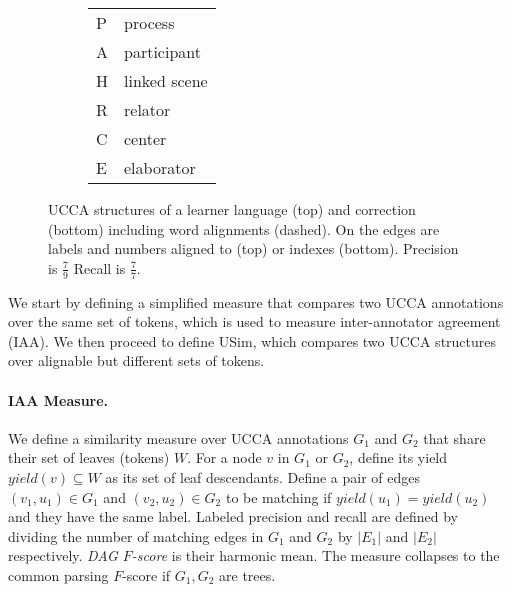 \documentclass[a4paper, 11pt]{article}
\begin{document}
\begin{figure}[t]
\begin{subfigure}{1.1\columnwidth}
{					\begin{adjustbox}{width=.3\columnwidth,margin=1pt,frame}
						\begin{tabular}{ll}
							P & process \\
							A & participant \\
							H & linked scene \\
							R & relator \\
							C & center \\
							E & elaborator \\
						\end{tabular}
					\end{adjustbox}
				}
			\end{subfigure}

				\caption{\label{fig:example}
					UCCA structures of a learner language (top) and correction (bottom) including word alignments (dashed). On the edges are labels and numbers aligned to (top) or indexes (bottom). Precision is $\frac{7}{9}$ Recall is $\frac{7}{7}$.
				}
			\end{figure}
We start by defining a simplified measure that compares two UCCA annotations over the 
same set of tokens, which is used to measure inter-annotator agreement (IAA). We then
proceed to define {\sc USim}, which compares two UCCA structures
over alignable but different sets of tokens.

\paragraph{IAA Measure.} We define a similarity measure over UCCA annotations 
$G_1$ and $G_2$ that share their set of leaves (tokens) $W$.
For a node $v$ in $G_1$ or $G_2$, define its yield $yield(v) \subseteq W$ as its
set of leaf descendants.
Define a pair of edges $(v_1,u_1) \in G_1$ and $(v_2,u_2) \in G_2$ to be matching
if $yield(u_1) = yield(u_2)$ and they have the same label.
Labeled precision and recall are defined by dividing the number of matching edges
in $G_1$ and $G_2$ by $|E_1|$ and $|E_2|$ respectively.
{\it DAG $F$-score} is their harmonic mean.
The measure collapses to the common parsing $F$-score if $G_1, G_2$ are trees.
\end{document}
